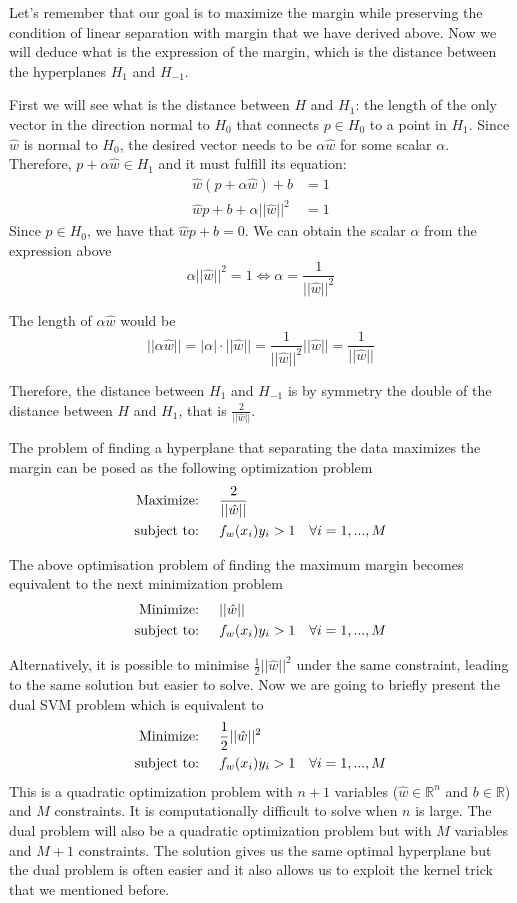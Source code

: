 Let's remember that our goal is to maximize the margin while preserving the condition of linear separation with margin that we have derived above. Now we will deduce what is the expression of the margin, which is the distance between the hyperplanes $H_1$ and $H_{-1}$. 

First we will see what is the distance between $H$ and $H_1$: the length of the only vector in the direction normal to $H_0$ that connects $p \in H_0$ to a point in $H_1$. Since $\hat{w}$ is normal to $H_0$, the desired vector needs to be $\alpha \hat{w}$ for some scalar $\alpha$. Therefore, $p + \alpha \hat{w} \in H_1$ and it must fulfill its equation:
\begin{align}
    \hat{w}(p+\alpha \hat{w}) +b &= 1 \\
    \hat{w}p + b + \alpha ||\hat{w}||^2 &= 1
\end{align}
Since $p \in H_0$, we have that $\hat{w}p + b =0$. We can obtain the scalar $\alpha$ from the expression above
$$\alpha ||\hat{w}||^2=1 \Longleftrightarrow \alpha = \frac{1}{||\hat{w}||^2} $$

The length of $\alpha \hat{w}$ would be $$||\alpha \hat{w}|| = |\alpha| \cdot ||\hat{w}|| = \frac{1}{||\hat{w}||^2} ||\hat{w}|| = \frac{1}{||\hat{w}||}$$

Therefore, the distance between $H_1$ and $H_{-1}$ is by symmetry the double of the distance between $H$ and $H_1$, that is $\frac{2}{||\hat{w}||}$. 

The problem of finding a hyperplane that separating the data maximizes the margin can be posed as the following optimization problem
\begin{align}
    \text{Maximize: \quad } &\frac{2}{||\hat{w}||} \\
    \text{subject to: \quad } &f_w(x_i)y_i>1 \quad \forall i=1,...,M
\end{align}

The above optimisation problem of finding the maximum margin becomes equivalent to the next minimization problem
\begin{align}
    \text{Minimize: \quad } &||\hat{w}|| \\
    \text{subject to: \quad } &f_w(x_i)y_i>1 \quad \forall i=1,...,M
\end{align}

Alternatively, it is possible to minimise $\frac{1}{2} ||\hat{w}||^2$ under the same constraint, leading to the same solution but easier to solve. Now we are going to briefly present the dual SVM problem which is equivalent to 
\begin{align}
    \text{Minimize: \quad } &\frac{1}{2}||\hat{w}||^2 \\
    \text{subject to: \quad } &f_w(x_i)y_i>1 \quad \forall i=1,...,M
\end{align}
This is a quadratic optimization problem with $n+1$ variables ($\hat{w}\in\mathbb{R}^n$ and $b\in \mathbb{R}$) and $M$ constraints. It is computationally difficult to solve when $n$ is large. The dual problem will also be a quadratic optimization problem but with $M$ variables and $M+1$ constraints. The solution gives us the same optimal hyperplane but the dual problem is often easier and it also allows us to exploit the kernel trick that we mentioned before. 

